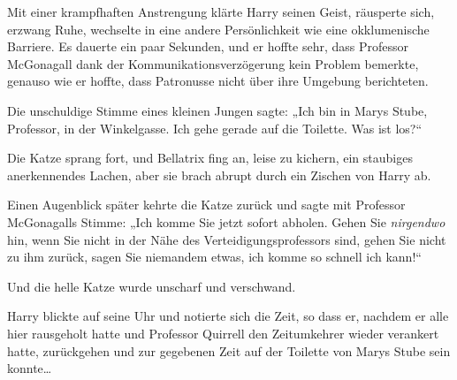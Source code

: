 Mit einer krampfhaften Anstrengung klärte Harry seinen Geist, räusperte sich, erzwang Ruhe, wechselte in eine andere Persönlichkeit wie eine okklumenische Barriere. Es dauerte ein paar Sekunden, und er hoffte sehr, dass Professor McGonagall dank der Kommunikationsverzögerung kein Problem bemerkte, genauso wie er hoffte, dass Patronusse nicht über ihre Umgebung berichteten.

Die unschuldige Stimme eines kleinen Jungen sagte: „Ich bin in Marys Stube, Professor, in der Winkelgasse. Ich gehe gerade auf die Toilette. Was ist los?“

Die Katze sprang fort, und Bellatrix fing an, leise zu kichern, ein staubiges anerkennendes Lachen, aber sie brach abrupt durch ein Zischen von Harry ab.

Einen Augenblick später kehrte die Katze zurück und sagte mit Professor McGonagalls Stimme: „Ich komme Sie jetzt sofort abholen. Gehen Sie \emph{nirgendwo} hin, wenn Sie nicht in der Nähe des Verteidigungsprofessors sind, gehen Sie nicht zu ihm zurück, sagen Sie niemandem etwas, ich komme so schnell ich kann!“

Und die helle Katze wurde unscharf und verschwand.

Harry blickte auf seine Uhr und notierte sich die Zeit, so dass er, nachdem er alle hier rausgeholt hatte und Professor Quirrell den Zeitumkehrer wieder verankert hatte, zurückgehen und zur gegebenen Zeit auf der Toilette von Marys Stube sein konnte…

